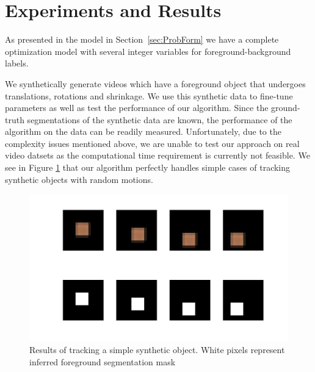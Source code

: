 \section{Experiments and Results}
\label{sec:Expt}
As presented in the model in Section~\ref{sec:ProbForm} we have a complete optimization
model with several integer variables for foreground-background labels.

%
%


We synthetically generate videos which have a foreground object that undergoes translations, rotations and shrinkage. We use this synthetic data to fine-tune parameters as well as test the performance of our algorithm. Since the ground-truth segmentations of the synthetic data are known, the performance of the algorithm on the data can be readily measured. Unfortunately, due to the complexity issues mentioned above, we are unable to test our approach on real video datsets as the computational time requirement is currently not feasible. We see in Figure \ref{fig:trackSquare} that our algorithm perfectly handles simple cases of tracking synthetic objects with random motions.

\begin{figure}[t]
\begin{center}
	\includegraphics[scale=0.35]{figures/easy_square_tracking.jpg}
	\caption{Results of tracking a simple synthetic object. White pixels represent inferred foreground segmentation mask}
	\label{fig:trackSquare}
\end{center}
\end{figure}

